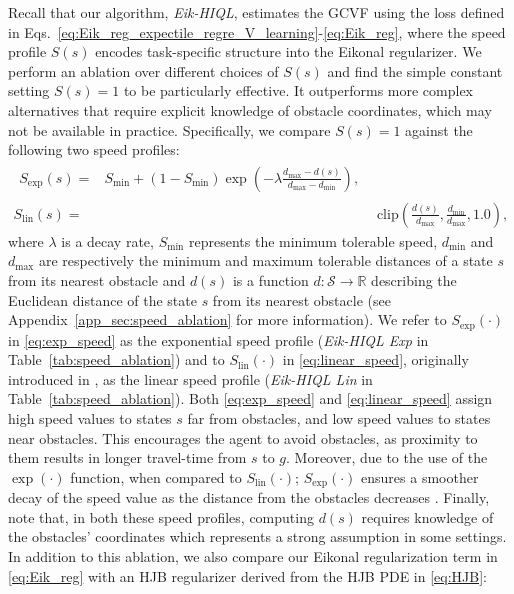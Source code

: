 \documentclass{article}
\theoremstyle{plain}
\theoremstyle{definition}
\theoremstyle{remark}
\begin{document}
Recall that our algorithm, \textit{Eik-HIQL}, estimates the GCVF using the loss defined in Eqs.~\eqref{eq:Eik_reg_expectile_regre_V_learning}-\eqref{eq:Eik_reg}, where the speed profile $S(s)$ encodes task-specific structure into the Eikonal regularizer. We perform an ablation over different choices of $S(s)$ and find the simple constant setting $S(s) = 1$ to be particularly effective. It outperforms more complex alternatives that require explicit knowledge of obstacle coordinates, which may not be available in practice. Specifically, we compare $S(s) = 1$ against the following two speed profiles:
\begin{align}
    \begin{split}
        S_{\text{exp}}(s) =& S_{\text{min}} + (1 - S_{\text{min}})\exp\left(-\lambda\frac{d_{\text{max}} - d(s)}{d_{\text{max}} - d_{\text{min}}}\right),    
    \end{split} \label{eq:exp_speed} \\
    S_{\text{lin}}(s) =& \text{clip}\left(\frac{d(s)}{d_{\text{max}}}, \frac{d_{\text{min}}}{d_{\text{max}}}, 1.0\right), \label{eq:linear_speed}
\end{align}
where $\lambda$ is a decay rate, $S_{\text{min}}$ represents the minimum tolerable speed, $d_{\text{min}}$ and $d_{\text{max}}$ are respectively the minimum and maximum tolerable distances of a state $s$ from its nearest obstacle and $d(s)$ is a function $d:\mathcal{S} \to \mathbb{R}$ describing the Euclidean distance of the state $s$ from its nearest obstacle (see Appendix~\ref{app_sec:speed_ablation} for more information). We refer to $S_{\text{exp}}(\cdot)$ in \eqref{eq:exp_speed} as the exponential speed profile (\textit{Eik-HIQL Exp} in Table~\ref{tab:speed_ablation}) and to $S_{\text{lin}}(\cdot)$ in \eqref{eq:linear_speed}, originally introduced in \cite{nintfields}, as the linear speed profile (\textit{Eik-HIQL Lin} in Table~\ref{tab:speed_ablation}). Both \eqref{eq:exp_speed} and \eqref{eq:linear_speed} assign high speed values to states $s$ far from obstacles, and low speed values to states near obstacles. This encourages the agent to avoid obstacles, as proximity to them results in longer travel-time from $s$ to $g$. Moreover, due to the use of the $\exp(\cdot)$ function, when compared to $S_{\text{lin}}(\cdot)$; $S_{\text{exp}}(\cdot)$ ensures a smoother decay of the speed value as the distance from the obstacles decreases \cite{ni2024physics}. Finally, note that, in both these speed profiles, computing $d(s)$ requires knowledge of the obstacles' coordinates which represents a strong assumption in some settings. In addition to this ablation, we also compare our Eikonal regularization term in \eqref{eq:Eik_reg} with an HJB regularizer derived from the HJB PDE in \eqref{eq:HJB}:
\end{document}
